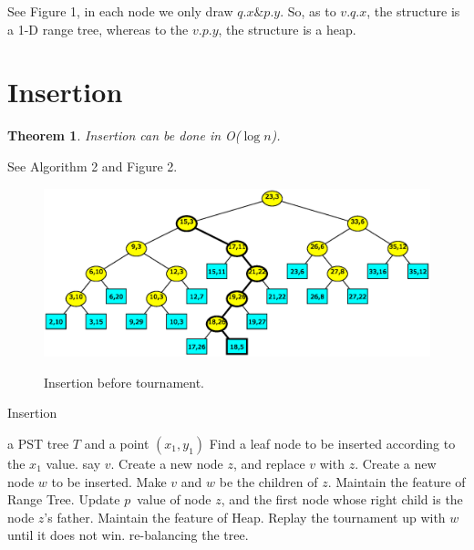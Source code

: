 \documentclass{acm_proc_article-sp}
\newtheorem{theorem}{Theorem}
\begin{document}
See Figure 1, in each node we only draw $q.x \& p.y$. So, as to
$v.q.x$, the structure is a 1-D range tree, whereas to the $v.p.y$,
the structure is a heap.
\section{Insertion}
\begin{theorem}
Insertion can be done in O($\log n$). 
\end{theorem}

See Algorithm 2 and
Figure 2.
\begin{figure}[!h]
  \centering
  \includegraphics[scale=0.5]{pst_just_insert}\\
  \caption{Insertion before tournament.}\label{fig:pst_just_insert}
\end{figure}

\begin{algorithm}[!h]
\caption{Insertion} \label{alg:pst_insert}
    \begin{algorithmic}[1]
     \REQUIRE a PST tree $T$ and a point $(x_1,y_1)$
     \STATE Find a leaf node to be inserted according to the $x_1$ value. say $v$.
     \STATE Create a new node $z$, and replace $v$ with $z$.
     \STATE Create a new node $w$ to be inserted.
     \STATE Make $v$ and $w$ be the children of $z$.
     \STATE Maintain the feature of Range Tree.
     Update $p$\ value of node $z$, and the first node whose right child is the node $z$'s father.
     \STATE Maintain the feature of Heap. Replay the tournament up with $w$ until it does not win.
     \STATE re-balancing the tree.
    \end{algorithmic}
\end{algorithm}
\end{document}
